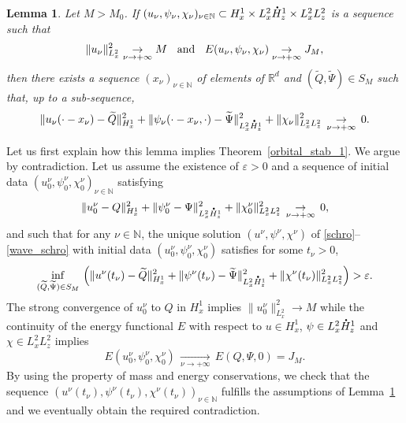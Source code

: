 \documentclass[10pt]{amsart}
\newtheorem{lemma}{Lemma}[section]
\theoremstyle{definition}
\newcommand*{\overbigdot}[1]{%
\accentset{\mbox{\large\bfseries .}}{#1}}
\newcommand{\R}{\mathbb{R}}
\begin{document}
\begin{lemma}\label{key_lemma_stab1}
Let $M>M_0$.
If $(u_{\nu},\psi_{\nu},\chi_{\nu})_{\nu\in\mathbb N}\subset H_{x}^{1}\times L_{x}^{2}\overbigdot{H}_{z}^{1}\times L_{x}^{2}L_{z}^{2}$ is a sequence such that
\[
\|u_{\nu}\|_{L_{x}^{2}}^{2}\underset{\nu\to+\infty}{\to}M \hspace{0.2cm}\text{ and }\hspace{0.2cm} E(u_{\nu},\psi_{\nu},\chi_{\nu})\underset{\nu\to+\infty}{\to}J_{M},
\]
then there exists a sequence $(x_{\nu})_{\nu\in\mathbb N}$
of elements of
$\R^{d}$ and $(\widetilde{Q},\widetilde{\Psi})\in S_{M}$ such that, up to a sub-sequence,
\[
\|u_{\nu}(\cdot-x_{\nu})-\widetilde{Q}\|_{H_{x}^{1}}^{2}+\|\psi_{\nu}(\cdot-x_{\nu},\cdot)-\widetilde{\Psi}\|_{L_{x}^{2}\overbigdot{H}_{z}^{1}}^{2}+\|\chi_{\nu}\|_{L_{x}^{2}L_{z}^{2}}^{2}\,\underset{\nu\to +\infty}{\to}\,0.
\]
\end{lemma}

Let us first explain how this lemma implies Theorem~\ref{orbital_stab_1}. We argue by contradiction. Let us assume the existence of $\varepsilon>0$ and a sequence of initial data $(u_{0}^{\nu},\psi_{0}^{\nu},\chi_{0}^{\nu})_{\nu\in\mathbb N}$ satisfying
\[
\|u_{0}^{\nu}-Q\|_{H_{x}^{1}}^{2}+\|\psi_{0}^{\nu}-\Psi\|_{L_{x}^{2}\overbigdot{H}_{z}^{1}}^{2}+\|\chi_{0}^{\nu}\|_{L_{x}^{2}L_{z}^{2}}^{2}\,\underset{\nu\to +\infty}{\to}\,0,
\]
and such that for any $\nu\in\mathbb{N}$, the unique solution $(u^{\nu},\psi^{\nu},\chi^{\nu})$ of \eqref{schro}--\eqref{wave_schro}
with initial data $(u_{0}^{\nu},\psi_{0}^{\nu},\chi_{0}^{\nu})$ satisfies for some $t_{\nu}>0$,
\[
\underset{(\widetilde{Q},\widetilde{\Psi})\in S_{M}}{\inf}\,\left(\|u^{\nu}(t_{\nu})-\widetilde{Q}\|_{H_{x}^{1}}^{2}+\|\psi^{\nu}(t_{\nu})-\widetilde{\Psi}\|_{L_{x}^{2}\overbigdot{H}_{z}^{1}}^{2}+\|\chi^{\nu}(t_{\nu})\|_{L_{x}^{2}L_{z}^{2}}^{2}\right)>\varepsilon.
\]
The strong convergence of $u_{0}^{\nu}$ to $Q$ in $H_{x}^{1}$ implies $\|u_{0}^{\nu}\|_{L_{x}^{2}}^{2}\to M$ while the continuity of the energy functional $E$ with respect to $u\in H_{x}^{1}$, $\psi\in L_{x}^{2}\overbigdot{H}_{z}^{1}$ and $\chi\in L_{x}^{2}L_{z}^{2}$ implies
\[
E(u_{0}^{\nu},\psi_{0}^{\nu},\chi_{0}^{\nu})\,\underset{\nu\to+\infty}{\to}\,E(Q,\Psi,0)=J_{M}.
\]
By using the property of mass and energy conservations, we check that the sequence $(u^{\nu}(t_{\nu}) , \psi^{\nu}(t_{\nu}) , \chi^{\nu}(t_{\nu}) )_{\nu\in\mathbb N}$ fulfills the assumptions of Lemma~\ref{key_lemma_stab1} and we eventually obtain the required contradiction.
\end{document}
